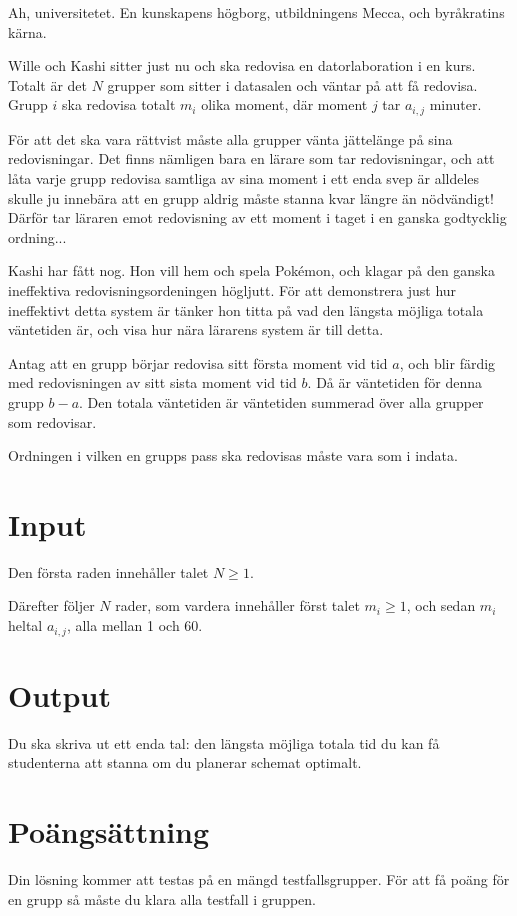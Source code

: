 
Ah, universitetet. En kunskapens högborg, utbildningens Mecca, och byråkratins kärna.

Wille och Kashi sitter just nu och ska redovisa en datorlaboration i en kurs. Totalt
är det $N$ grupper som sitter i datasalen och väntar på att få redovisa. Grupp $i$
ska redovisa totalt $m_i$ olika moment, där moment $j$ tar $a_{i, j}$ minuter.

För att det ska vara rättvist måste alla grupper vänta jättelänge på sina redovisningar.
Det finns nämligen bara en lärare som tar redovisningar, och att låta varje grupp
redovisa samtliga av sina moment i ett enda svep är alldeles skulle ju innebära
att en grupp aldrig måste stanna kvar längre än nödvändigt! Därför tar läraren
emot redovisning av ett moment i taget i en ganska godtycklig ordning...

Kashi har fått nog. Hon vill hem och spela Pokémon, och klagar på den ganska
ineffektiva redovisningsordeningen högljutt. För att demonstrera just hur ineffektivt
detta system är tänker hon titta på vad den längsta möjliga totala väntetiden är,
och visa hur nära lärarens system är till detta.

Antag att en grupp börjar redovisa sitt första moment vid tid $a$, och
blir färdig med redovisningen av sitt sista moment vid tid $b$. Då är väntetiden
för denna grupp $b - a$. Den totala väntetiden är väntetiden summerad över alla
grupper som redovisar.

Ordningen i vilken en grupps pass ska redovisas måste vara som i indata.

\section*{Input}
Den första raden innehåller talet $N \ge 1$.

Därefter följer $N$ rader, som vardera innehåller först talet $m_i \ge 1$, och sedan $m_i$ heltal $a_{i,j}$, alla mellan 1 och 60.


\section*{Output}
Du ska skriva ut ett enda tal: den längsta möjliga totala tid du kan få studenterna att stanna om du planerar schemat optimalt.

\section*{Poängsättning}
Din lösning kommer att testas på en mängd testfallsgrupper. För att få poäng för en grupp så måste du klara alla testfall i gruppen.

